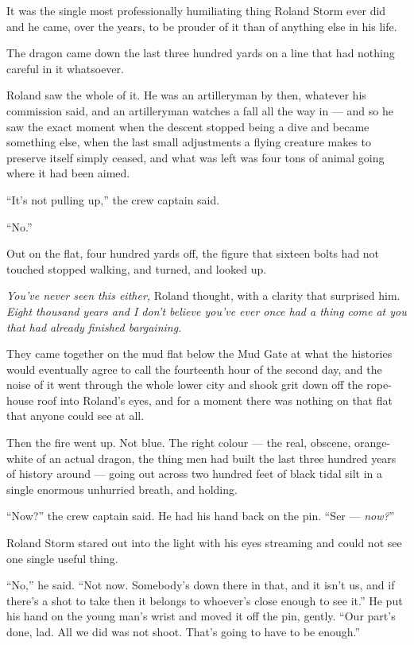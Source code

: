 It was the single most professionally humiliating thing Roland Storm ever did and he came, over the years, to be prouder of it than of anything else in his life.

The dragon came down the last three hundred yards on a line that had nothing careful in it whatsoever.

Roland saw the whole of it. He was an artilleryman by then, whatever his commission said, and an artilleryman watches a fall all the way in — and so he saw the exact moment when the descent stopped being a dive and became something else, when the last small adjustments a flying creature makes to preserve itself simply ceased, and what was left was four tons of animal going where it had been aimed.

“It’s not pulling up,” the crew captain said.

“No.”

Out on the flat, four hundred yards off, the figure that sixteen bolts had not touched stopped walking, and turned, and looked up.

\textit{You’ve never seen this either,} Roland thought, with a clarity that surprised him. \textit{Eight thousand years and I don’t believe you’ve ever once had a thing come at you that had already finished bargaining.}

\sceneBreak

They came together on the mud flat below the Mud Gate at what the histories would eventually agree to call the fourteenth hour of the second day, and the noise of it went through the whole lower city and shook grit down off the rope-house roof into Roland’s eyes, and for a moment there was nothing on that flat that anyone could see at all.

Then the fire went up. Not blue. The right colour — the real, obscene, orange-white of an actual dragon, the thing men had built the last three hundred years of history around — going out across two hundred feet of black tidal silt in a single enormous unhurried breath, and holding.

“Now?” the crew captain said. He had his hand back on the pin. “Ser — \textit{now?}”

Roland Storm stared out into the light with his eyes streaming and could not see one single useful thing.

“No,” he said. “Not now. Somebody’s down there in that, and it isn’t us, and if there’s a shot to take then it belongs to whoever’s close enough to see it.” He put his hand on the young man’s wrist and moved it off the pin, gently. “Our part’s done, lad. All we did was not shoot. That’s going to have to be enough.”

